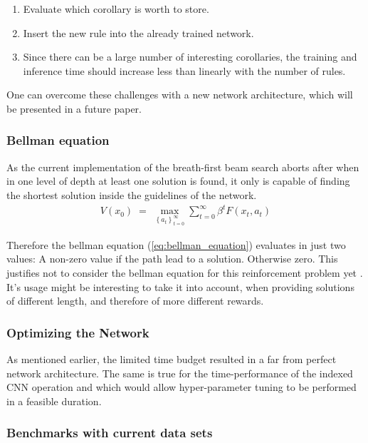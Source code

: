 \documentclass{scrartcl}
\theoremstyle{definition}
\begin{document}
\begin{enumerate}[label=(\roman*)]
	\item Evaluate which corollary is worth to store.
	\item Insert the new rule into the already trained network.
	\item Since there can be a large number of interesting corollaries, the training and inference time should increase less than linearly with the number of rules.
\end{enumerate}

One can overcome these challenges with a new network architecture, which will be presented in a future paper.

\subsubsection{Bellman equation}

As the current implementation of the breath-first beam search aborts after when in one level of depth at least one solution is found,
it only is capable of finding the shortest solution inside the guidelines of the network.
\begin{align}
	V(x_{0})\;=\;\max _{\left\{a_{t}\right\}_{t=0}^{\infty }}\sum _{t=0}^{\infty }\beta ^{t}F(x_{t},a_{t})
	\label{eq:bellman_equation}
\end{align}

Therefore the bellman equation (\ref{eq:bellman_equation}) evaluates in just two values: A non-zero value if the path lead to a solution. Otherwise zero.
This justifies not to consider the bellman equation for this reinforcement problem yet \cite{bellman}.
It's usage might be interesting to take it into account, when providing solutions of different length, and therefore of more different rewards.


\subsubsection{Optimizing the Network}

As mentioned earlier, the limited time budget resulted in a far from perfect network architecture.
The same is true for the time-performance of the indexed CNN operation and which would allow hyper-parameter tuning to be performed in a feasible duration.

\subsubsection{Benchmarks with current data sets}
\end{document}
